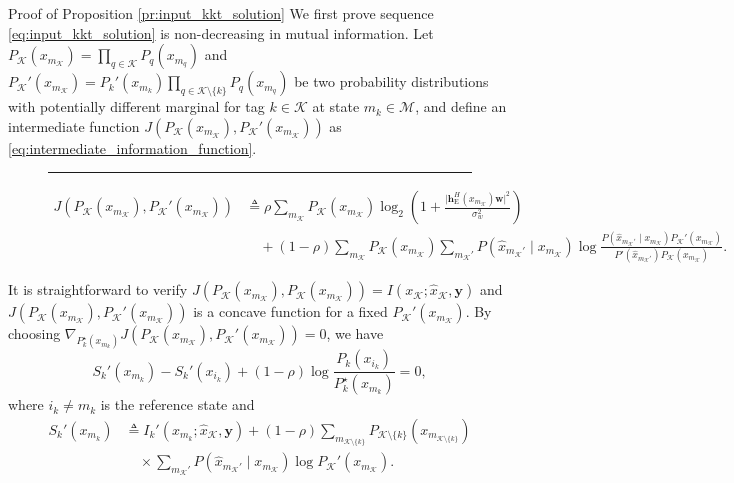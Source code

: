 \documentclass[journal]{IEEEtran}
\begin{document}
\begin{appendix}
	\begin{subsection}{Proof of Proposition \ref{pr:input_kkt_solution}}
		We first prove sequence \eqref{eq:input_kkt_solution} is non-decreasing in mutual information.
		Let $P_{\mathcal{K}}(x_{m_{\mathcal{K}}}) = \prod_{q \in \mathcal{K}} P_q(x_{m_q})$ and $P_{\mathcal{K}}'(x_{m_{\mathcal{K}}}) = P_k'(x_{m_k}) \prod_{q \in \mathcal{K} \setminus \{k\}} P_q(x_{m_q})$ be two probability distributions with potentially different marginal for tag $k \in \mathcal{K}$ at state $m_k \in \mathcal{M}$, and define an intermediate function $J \left( P_{\mathcal{K}}(x_{m_{\mathcal{K}}}),P_{\mathcal{K}}'(x_{m_{\mathcal{K}}}) \right)$ as \eqref{eq:intermediate_information_function}.
		\begin{figure}[!b]
			\hrule
			\begin{align}
				J \left( P_{\mathcal{K}}(x_{m_{\mathcal{K}}}),P_{\mathcal{K}}'(x_{m_{\mathcal{K}}}) \right)
				 & \triangleq \rho \sum_{m_{\mathcal{K}}} P_{\mathcal{K}}(x_{m_{\mathcal{K}}}) \log_2 \left(1 + \frac{\lvert \boldsymbol{h}_{\mathrm{E}}^H(x_{m_{\mathcal{K}}}) \boldsymbol{w} \rvert^2}{\sigma_w^2}\right)\nonumber                                                                                                                            \\
				 & \quad + (1 - \rho) \sum_{m_{\mathcal{K}}} P_{\mathcal{K}}(x_{m_{\mathcal{K}}}) \sum_{m_{\mathcal{K}}'} P(\hat{x}_{m_{\mathcal{K}}'} \mid x_{m_{\mathcal{K}}}) \log \frac{P(\hat{x}_{m_{\mathcal{K}}'} \mid x_{m_{\mathcal{K}}}) P_{\mathcal{K}}'(x_{m_{\mathcal{K}}})}{P'(\hat{x}_{m_{\mathcal{K}}'}) P_{\mathcal{K}}(x_{m_{\mathcal{K}}})}.
				\label{eq:intermediate_information_function}
			\end{align}
		\end{figure}
		It is straightforward to verify $J \left( P_{\mathcal{K}}(x_{m_{\mathcal{K}}}),P_{\mathcal{K}}(x_{m_{\mathcal{K}}}) \right) = I(x_{\mathcal{K}};\hat{x}_{\mathcal{K}},\boldsymbol{y})$ and $J \left( P_{\mathcal{K}}(x_{m_{\mathcal{K}}}),P_{\mathcal{K}}'(x_{m_{\mathcal{K}}}) \right)$ is a concave function for a fixed $P_{\mathcal{K}}'(x_{m_{\mathcal{K}}})$.
		By choosing $\nabla_{P_k^\star(x_{m_k})} J \left( P_{\mathcal{K}}(x_{m_{\mathcal{K}}}),P_{\mathcal{K}}'(x_{m_{\mathcal{K}}}) \right) = 0$, we have
		\begin{equation}
			S_k'(x_{m_k}) - S_k'(x_{i_k}) + (1 - \rho) \log \frac{P_k(x_{i_k})}{P_k^\star(x_{m_k})} = 0,
			\label{eq:optimal_intermediate_information_condition}
		\end{equation}
		where $i_k \ne m_k$ is the reference state and
		\begin{align}
			S_k'(x_{m_k})
			 & \triangleq I_k'(x_{m_k};\hat{x}_{\mathcal{K}},\boldsymbol{y}) + (1 - \rho) \sum_{m_{\mathcal{K} \setminus \{k\}}} P_{\mathcal{K} \setminus \{k\}}(x_{m_{\mathcal{K} \setminus \{k\}}})\nonumber \\
			 & \quad \times \sum_{m_{\mathcal{K}}'} P(\hat{x}_{m_{\mathcal{K}}'} \mid x_{m_{\mathcal{K}}}) \log P_{\mathcal{K}}'(x_{m_{\mathcal{K}}}).
		\end{align}


\end{subsection}
\end{appendix}
\end{document}
